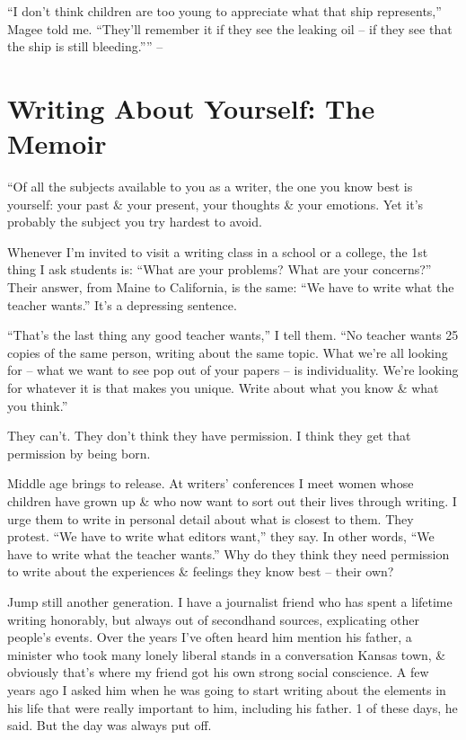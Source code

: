\documentclass{article}
\begin{document}
``I don't think children are too young to appreciate what that ship represents,'' Magee told me. ``They'll remember it if they see the leaking oil -- if they see that the ship is still bleeding.'''' -- \cite[pp. 113--126]{Zinsser2016}


\section{Writing About Yourself: The Memoir}
``Of all the subjects available to you as a writer, the one you know best is yourself: your past \& your present, your thoughts \& your emotions. Yet it's probably the subject you try hardest to avoid.

Whenever I'm invited to visit a writing class in a school or a college, the 1st thing I ask students is: ``What are your problems? What are your concerns?'' Their answer, from Maine to California, is the same: ``We have to write what the teacher wants.'' It's a depressing sentence.

``That's the last thing any good teacher wants,'' I tell them. ``No teacher wants 25 copies of the same person, writing about the same topic. What we're all looking for -- what we want to see pop out of your papers -- is individuality. We're looking for whatever it is that makes you unique. Write about what you know \& what you think.''

They can't. They don't think they have permission. I think they get that permission by being born.

Middle age brings to release. At writers' conferences I meet women whose children have grown up \& who now want to sort out their lives through writing. I urge them to write in personal detail about what is closest to them. They protest. ``We have to write what editors want,'' they say. In other words, ``We have to write what the teacher wants.'' Why do they think they need permission to write about the experiences \& feelings they know best -- their own?

Jump still another generation. I have a journalist friend who has spent a lifetime writing honorably, but always out of secondhand sources, explicating other people's events. Over the years I've often heard him mention his father, a minister who took many lonely liberal stands in a conversation Kansas town, \& obviously that's where my friend got his own strong social conscience. A few years ago I asked him when he was going to start writing about the elements in his life that were really important to him, including his father. 1 of these days, he said. But the day was always put off.
\end{document}

